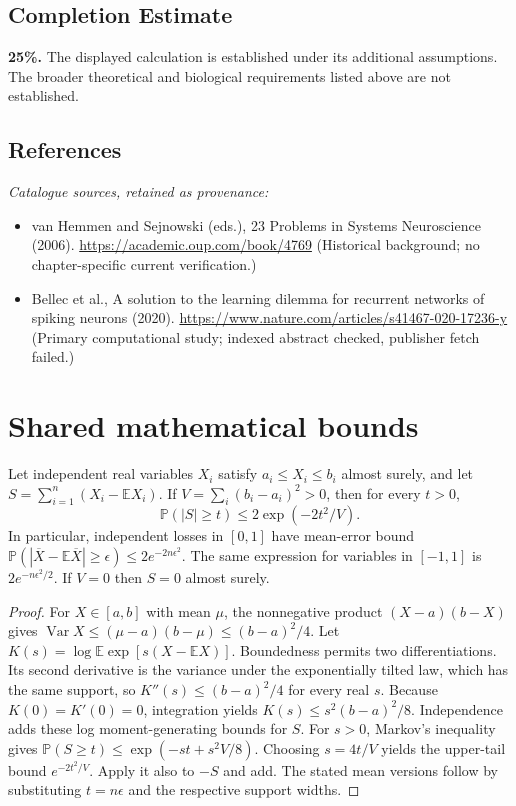 \documentclass[11pt]{article}
\begin{document}
\subsection{Completion Estimate}
\textbf{25\%.} The displayed calculation is established under its additional assumptions. The broader theoretical and biological requirements listed above are not established.
\subsection{References}
\noindent\emph{Catalogue sources, retained as provenance:}
\begin{itemize}
\item van Hemmen and Sejnowski (eds.), 23 Problems in Systems Neuroscience (2006). \url{https://academic.oup.com/book/4769} (Historical background; no chapter-specific current verification.)
\item Bellec et al., A solution to the learning dilemma for recurrent networks of spiking neurons (2020). \url{https://www.nature.com/articles/s41467-020-17236-y} (Primary computational study; indexed abstract checked, publisher fetch failed.)
\end{itemize}




\section{Shared mathematical bounds}\label{app:bounds}
\begin{lemma}\label{lem:bounded}
Let independent real variables $X_i$ satisfy $a_i\leq X_i\leq b_i$ almost surely,
and let $S=\sum_{i=1}^n(X_i-\mathbb{E} X_i)$. If
$V=\sum_i(b_i-a_i)^2>0$, then for every $t>0$,
\[
 \mathbb{P}(|S|\geq t)\leq 2\exp(-2t^2/V).
\]
In particular, independent losses in $[0,1]$ have mean-error bound
$\mathbb{P}(|\overline X-\mathbb{E}\overline X|\geq\epsilon)
\leq2e^{-2n\epsilon^2}$. The same expression for variables in $[-1,1]$
is $2e^{-n\epsilon^2/2}$. If $V=0$ then $S=0$ almost surely.
\end{lemma}
\begin{proof}
For $X\in[a,b]$ with mean $\mu$, the nonnegative product
$(X-a)(b-X)$ gives
$\operatorname{Var} X\leq(\mu-a)(b-\mu)\leq(b-a)^2/4$.
Let $K(s)=\log\mathbb{E}\exp[s(X-\mathbb{E} X)]$.
Boundedness permits two differentiations. Its second derivative is the variance
under the exponentially tilted law, which has the same support, so
$K''(s)\leq(b-a)^2/4$ for every real $s$.
Because $K(0)=K'(0)=0$, integration yields
$K(s)\leq s^2(b-a)^2/8$.
Independence adds these log moment-generating bounds for $S$.
For $s>0$, Markov's inequality gives
$\mathbb{P}(S\geq t)\leq\exp(-st+s^2V/8)$.
Choosing $s=4t/V$ yields the upper-tail bound $e^{-2t^2/V}$.
Apply it also to $-S$ and add. The stated mean versions follow by substituting
$t=n\epsilon$ and the respective support widths.
\end{proof}
\end{document}
